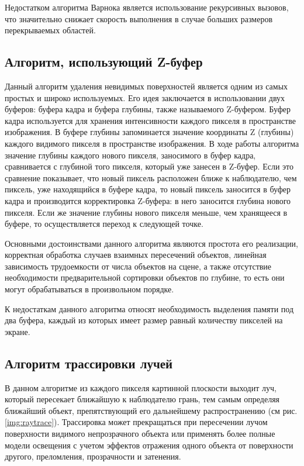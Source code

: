 Недостатком алгоритма Варнока является использование рекурсивных вызовов, что значительно снижает скорость выполнения в случае больших размеров перекрываемых областей.

\subsection{Алгоритм, использующий Z-буфер}

Данный алгоритм удаления невидимых поверхностей является одним из самых простых и широко используемых.
Его идея заключается в использовании двух буферов: буфера кадра и буфера глубины, также называемого Z-буфером.
Буфер кадра используется для хранения интенсивности каждого пикселя в пространстве изображения.
В буфере глубины запоминается значение координаты Z (глубины) каждого видимого пикселя в пространстве изображения.
В ходе работы алгоритма значение глубины каждого нового пикселя, заносимого в буфер кадра, сравнивается с глубиной того пикселя, который уже занесен в Z-буфер.
Если это сравнение показывает, что новый пиксель расположен ближе к наблюдателю, чем пиксель, уже находящийся в буфере кадра, то новый пиксель заносится в буфер кадра и производится корректировка Z-буфера: в него заносится глубина нового пикселя. Если же значение глубины нового пикселя меньше, чем хранящееся в буфере, то осуществляется переход к следующей точке. \cite{Rogers}\cite{Newman}


Основными достоинствами данного алгоритма являются простота его реализации, корректная обработка случаев взаимных пересечений объектов, линейная зависимость трудоемкости от числа объектов на сцене, а также отсутствие необходимости предварительной сортировки объектов по глубине, то есть они могут обрабатываться в произвольном порядке.

К недостаткам данного алгоритма относят необходимость выделения памяти под два буфера, каждый из которых имеет размер равный количеству пикселей на экране.

\subsection{Алгоритм трассировки лучей}

В данном алгоритме из каждого пикселя картинной плоскости выходит луч, который пересекает ближайшую к наблюдателю грань, тем самым определяя ближайший объект, препятствующий его дальнейшему распространению (см рис. \ref{img:raytrace}).
Трассировка может прекращаться при пересечении лучом поверхности видимого непрозрачного объекта или применять более полные модели освещения с учетом эффектов отражения одного объекта от поверхности другого, преломления, прозрачности и затенения.

